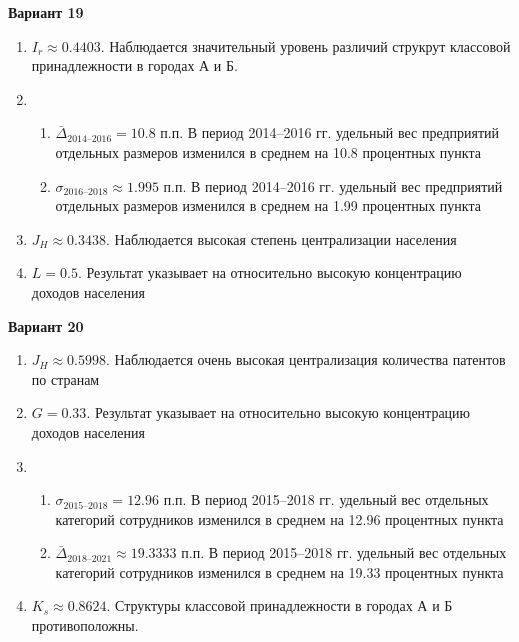 \documentclass{article}
\begin{document}
\textbf{Вариант 19}
\begin{enumerate}
\item $I_r\approx 0.4403$. Наблюдается значительный уровень различий струкрут классовой принадлежности в городах А и Б.
\item \begin{enumerate} \item $\bar\Delta_\text{2014--2016}= 10.8$ п.п. В период 2014--2016 гг. удельный вес предприятий отдельных размеров изменился в среднем на 10.8 процентных пункта
\item $\sigma_\text{2016--2018}\approx 1.995$ п.п. В период 2014--2016 гг. удельный вес предприятий отдельных размеров изменился в среднем на 1.99 процентных пункта\end{enumerate}
\item $J_H \approx 0.3438$. Наблюдается высокая степень централизации населения
\item $L= 0.5$. Результат указывает на относительно высокую концентрацию доходов населения
\end{enumerate}

\textbf{Вариант 20}
\begin{enumerate}
\item $J_H \approx 0.5998$. Наблюдается очень высокая централизация количества патентов по странам
\item $G= 0.33$. Результат указывает на относительно высокую концентрацию доходов населения
\item \begin{enumerate} \item $\sigma_\text{2015--2018}= 12.96$ п.п. В период 2015--2018 гг. удельный вес отдельных категорий сотрудников изменился в среднем на 12.96 процентных пункта
\item $\bar\Delta_\text{2018--2021}\approx 19.3333$ п.п. В период 2015--2018 гг. удельный вес отдельных категорий сотрудников изменился в среднем на 19.33 процентных пункта\end{enumerate}
\item $K_s\approx 0.8624$. Структуры классовой принадлежности в городах А и Б противоположны.
\end{enumerate}
\end{document}
